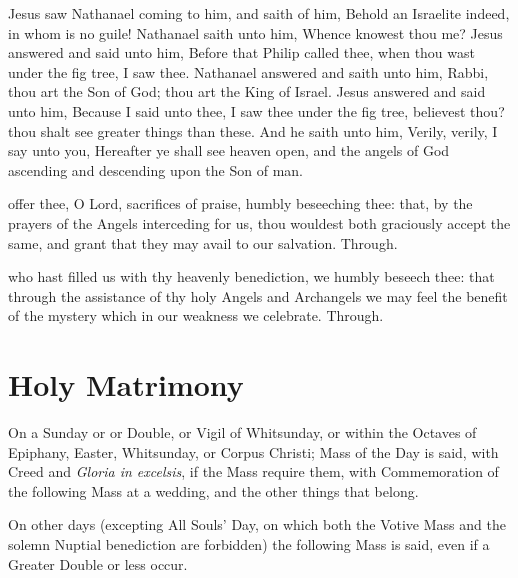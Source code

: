 \vspace{-2ex}

 Jesus saw Nathanael coming to him, and saith of him, Behold an Israelite indeed, in whom is no guile! Nathanael saith unto him, Whence knowest thou me? Jesus answered and said unto him, Before that Philip called thee, when thou wast under the fig tree, I saw thee. Nathanael answered and saith unto him, Rabbi, thou art the Son of God; thou art the King of Israel. Jesus answered and said unto him, Because I said unto thee, I saw thee under the fig tree, believest thou? thou shalt see greater things than these. And he saith unto him, Verily, verily, I say unto you, Hereafter ye shall see heaven open, and the angels of God ascending and descending upon the Son of man.


\vspace{-2ex}

 offer thee, O Lord, sacrifices of praise, humbly beseeching thee: that, by the prayers of the Angels interceding for us, thou wouldest both graciously accept the same, and grant that they may avail to our salvation. Through.

\vspace{-1ex}


\vspace{-3ex}

 who hast filled us with thy heavenly benediction, we humbly beseech thee: that through the assistance of thy holy Angels and Archangels we may feel the benefit of the mystery which in our weakness we celebrate. Through.

\clearpage

\section{Holy Matrimony}\label{MatrimonyMass}
\fancyhead[RE,LO]{}
\begin{secrubric}
    On a Sunday or  or  Double, or Vigil of Whitsunday, or within the Octaves of Epiphany, Easter, Whitsunday, or Corpus Christi; Mass of the Day is said, with Creed and \emph{Gloria in excelsis}, if the Mass require them, with Commemoration of the following Mass at a wedding, and the other things that belong.\par
    On other days (excepting All Souls' Day, on which both the Votive Mass and the solemn Nuptial benediction are forbidden) the following Mass is said, even if a Greater Double or less occur.
\end{secrubric}

